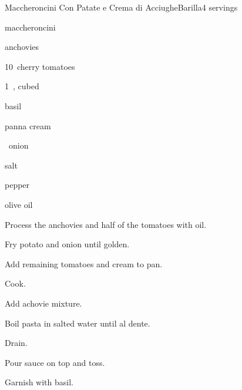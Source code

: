 \begin{recipe}{Maccheroncini Con Patate e Crema di Acciughe}{Barilla}{4 servings}

\begin{ingredients}
\item {} maccheroncini
\item {} anchovies
\item 10~cherry tomatoes
\item 1~, cubed
\item basil
\item {} panna cream
\item \half~onion
\item salt
\item pepper
\item olive oil
\end{ingredients}

\begin{directions}
\item Process the anchovies and half of the tomatoes with oil.
\item Fry potato and onion until golden.
\item Add remaining tomatoes and cream to pan.
\item Cook.
\item Add achovie mixture.
\item Boil pasta in salted water until al dente.
\item Drain.
\item Pour sauce on top and toss.
\item Garnish with basil.
\end{directions}

\end{recipe}

